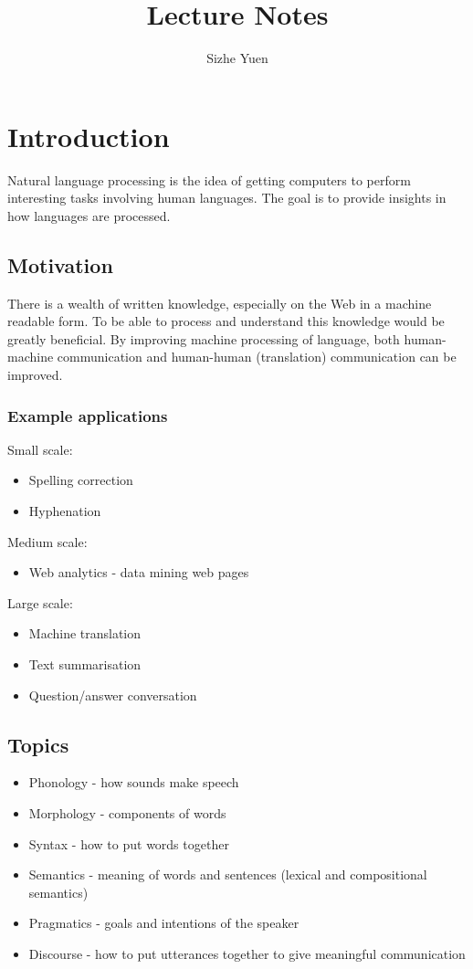 \documentclass{sty/SizheArticle}
\title{Lecture Notes}
\author{Sizhe Yuen}
\begin{document}
\tableofcontents
\clearpage

\section{Introduction}
Natural language processing is the idea of getting computers to perform interesting
tasks involving human languages. The goal is to provide insights in
how languages are processed.

\subsection{Motivation}
There is a wealth of written knowledge, especially on the Web in a machine readable
form. To be able to process and understand this knowledge would be greatly
beneficial. By improving machine processing of language, both human-machine
communication and human-human (translation) communication can be improved.

\subsubsection{Example applications}
Small scale:
\begin{itemize}
\item Spelling correction
\item Hyphenation
\end{itemize}

Medium scale:
\begin{itemize}
\item Web analytics - data mining web pages
\end{itemize}

Large scale:
\begin{itemize}
\item Machine translation
\item Text summarisation
\item Question/answer conversation
\end{itemize}

\subsection{Topics}
\begin{itemize}
\item Phonology - how sounds make speech
\item Morphology - components of words
\item Syntax - how to put words together
\item Semantics - meaning of words and sentences (lexical and compositional 
semantics)
\item Pragmatics - goals and intentions of the speaker
\item Discourse - how to put utterances together to give meaningful communication
\end{itemize}
\end{document}

